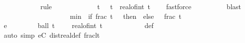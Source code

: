 \begin{isabellebody}
\ \ \ \ \ \ \ \ \ \ \isamarkupfalse%
\ {\isacharparenleft}{\kern0pt}rule\ {\isacartoucheopen}{\isasymgamma}\ {\isasymin}\ {\isacharbraceleft}{\kern0pt}{}{\isacharless}{\kern0pt}{\isachardot}{\kern0pt}{\isachardot}{\kern0pt}{}{\isacharbraceright}{\kern0pt}{\isacartoucheclose}{\isacharparenright}{\kern0pt}\isanewline
\ \ \ \ \ \ \ \ \isamarkupfalse%
\ {\isacartoucheopen}t\ {\isasymin}\ {\isacharbraceleft}{\kern0pt}{}{\isachardot}{\kern0pt}{\isachardot}{\kern0pt}{\isacharbraceright}{\kern0pt}{\isacartoucheclose}\ {\isacartoucheopen}t\ {\isacharless}{\kern0pt}\ real{\isacharunderscore}{\kern0pt}of{\isacharunderscore}{\kern0pt}int\ {\isasymlfloor}t{\isasymrfloor}\ {\isacharplus}{\kern0pt}\ {}{\isacartoucheclose}\ \isamarkupfalse%
\ fastforce\isanewline
\ \ \ \ \ \ \ \ \isamarkupfalse%
\ blast\isanewline
\ \ \ \ \ \ \ \ \isamarkupfalse%
\isanewline
\ \ \ \ \ \ \isamarkupfalse%
\ {\isasymepsilon}{\isacharprime}{\kern0pt}\ \ {\isachardoublequoteopen}{\isasymepsilon}{\isacharprime}{\kern0pt}\ {\isacharequal}{\kern0pt}\ min\ {\isasymepsilon}\ {\isacharparenleft}{\kern0pt}if\ frac\ t\ {\isacharequal}{\kern0pt}\ {}\ then\ {}{\isacharslash}{\kern0pt}{}\ else\ {}\ {\isacharminus}{\kern0pt}\ frac\ t{\isacharparenright}{\kern0pt}{\isachardoublequoteclose}\isanewline
\ \ \ \ \ \ \isamarkupfalse%
\ e{\isacharprime}{\kern0pt}{\isacharcolon}{\kern0pt}\ {\isachardoublequoteopen}{\isasymepsilon}{\isacharprime}{\kern0pt}\ {\isasymle}\ {\isasymepsilon}\ {\isasymand}\ {\isasymepsilon}{\isacharprime}{\kern0pt}\ {\isachargreater}{\kern0pt}\ {}\ {\isasymand}\ ball\ t\ {\isasymepsilon}{\isacharprime}{\kern0pt}\ {\isasyminter}\ {\isacharbraceleft}{\kern0pt}{}{\isachardot}{\kern0pt}{\isachardot}{\kern0pt}{\isacharbraceright}{\kern0pt}\ {\isasymsubseteq}\ {\isacharbraceleft}{\kern0pt}{}{\isachardot}{\kern0pt}{\isachardot}{\kern0pt}real{\isacharunderscore}{\kern0pt}of{\isacharunderscore}{\kern0pt}int\ {\isasymlfloor}t{\isasymrfloor}\ {\isacharplus}{\kern0pt}\ {}{\isacharbraceright}{\kern0pt}{\isachardoublequoteclose}\isanewline
\ \ \ \ \ \ \ \ \isamarkupfalse%
\ {\isasymepsilon}{\isacharprime}{\kern0pt}{\isacharunderscore}{\kern0pt}def\isanewline
\ \ \ \ \ \ \ \ \isamarkupfalse%
\ {\isacharparenleft}{\kern0pt}auto\ simp{\isacharcolon}{\kern0pt}\ eC{\isacharparenleft}{\kern0pt}{}{\isacharparenright}{\kern0pt}\ dist{\isacharunderscore}{\kern0pt}real{\isacharunderscore}{\kern0pt}def\ frac{\isacharunderscore}{\kern0pt}lt{\isacharunderscore}{\kern0pt}{}{\isacharparenright}{\kern0pt}\isanewline

\end{isabellebody}
